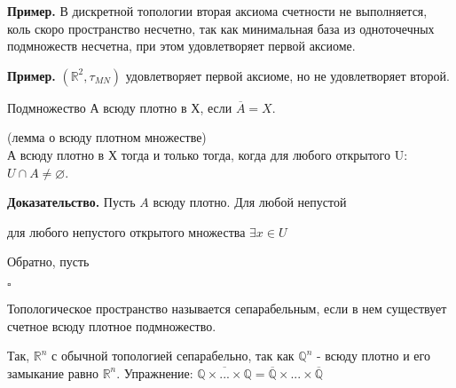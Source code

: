 \textbf{Пример.} В дискретной топологии вторая аксиома счетности
не выполняется, коль скоро пространство несчетно, так как минимальная база 
из одноточечных подмножеств несчетна, при этом удовлетворяет первой аксиоме.

\textbf{Пример.} $(\mathbb{R}^2,\tau_{MN})$ удовлетворяет первой аксиоме, но 
не удовлетворяет второй. 
\begin{defin}
Подмножество А всюду плотно в Х, если $\overline{A}=X$.
\end{defin}
\begin{theor}
    (лемма о всюду плотном множестве)\\
    А всюду плотно в Х тогда и только тогда, когда для любого открытого U:
    $U\cap A\ne\varnothing$.
\end{theor}
\textbf{Доказательство.} Пусть $A$ всюду плотно. Для любой непустой

для любого непустого открытого множества 
$\exists x\in U$ 

Обратно, пусть

$\square$ \\

\begin{defin}
Топологическое пространство называется сепарабельным, если в нем существует
счетное всюду плотное подмножество.
\end{defin}
Так, $\mathbb{R}^n$ с обычной топологией 
сепарабельно, так как $\mathbb{Q}^n$ - всюду плотно и 
его замыкание равно $\mathbb{R}^n$. Упражнение:
$\overline{\mathbb{Q}\times...\times\mathbb{Q}}=\overline{\mathbb{Q}}\times...
\times\overline{\mathbb{Q}}$



